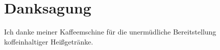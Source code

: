 \chapter{Danksagung}

Ich danke meiner Kaffeemschine für die unermüdliche Bereitstellung koffeinhaltiger Heißgetränke.